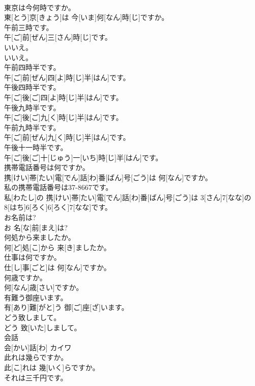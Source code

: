 \documentclass[8pt]{extreport}
\begin{document}
\begin{CJK}{UTF8}{min}
\\	東京は今何時ですか。	
\\	東[とう]京[きょう]は 今[いま]何[なん]時[じ]ですか。
\\	午前三時です。	
\\	午[ご]前[ぜん]三[さん]時[じ]です。
\\	いいえ。	
\\	いいえ。
\\	午前四時半です。	
\\	午[ご]前[ぜん]四[よ]時[じ]半[はん]です。
\\	午後四時半です。	
\\	午[ご]後[ご]四[よ]時[じ]半[はん]です。
\\	午後九時半です。	
\\	午[ご]後[ご]九[く]時[じ]半[はん]です。
\\	午前九時半です。	
\\	午[ご]前[ぜん]九[く]時[じ]半[はん]です。
\\	午後十一時半です。	
\\	午[ご]後[ご]十[じゅう]一[いち]時[じ]半[はん]です。
\\	携帯電話番号は何ですか。	
\\	携[けい]帯[たい]電[でん]話[わ]番[ばん]号[ごう]は 何[なん]ですか。
\\	私の携帯電話番号は37-8667です。	
\\	私[わたし]の 携[けい]帯[たい]電[でん]話[わ]番[ばん]号[ごう]は 3[さん]7[なな]の 8[はち]6[ろく]6[ろく]7[なな]です。
\\	お名前は?	
\\	お 名[な]前[まえ]は?
\\	何処から来ましたか。	
\\	何[ど]処[こ]から 来[き]ましたか。
\\	仕事は何ですか。	
\\	仕[し]事[ごと]は 何[なん]ですか。
\\	何歳ですか。	
\\	何[なん]歳[さい]ですか。
\\	有難う御座います。	
\\	有[あり]難[がと]う 御[ご]座[ざ]います。
\\	どう致しまして。	
\\	どう 致[いた]しまして。
\\	会話	
\\	会[かい]話[わ]	カイワ
\\	此れは幾らですか。	
\\	此[こ]れは 幾[いく]らですか。
\\	それは三千円です。	

\end{CJK}
\end{document}
